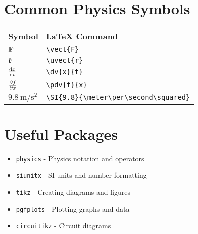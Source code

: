\documentclass[11pt]{book}
\begin{document}
\section{Common Physics Symbols}
\begin{tabular}{ll}
    \toprule
    Symbol & LaTeX Command \\
    \midrule
    $\mathbf{F}$ & \texttt{\textbackslash vect\{F\}} \\
    $\hat{\mathbf{r}}$ & \texttt{\textbackslash uvect\{r\}} \\
    $\dv{x}{t}$ & \texttt{\textbackslash dv\{x\}\{t\}} \\
    $\pdv{f}{x}$ & \texttt{\textbackslash pdv\{f\}\{x\}} \\
    $\SI{9.8}{\meter\per\second\squared}$ & \texttt{\textbackslash SI\{9.8\}\{\textbackslash meter\textbackslash per\textbackslash second\textbackslash squared\}} \\
    \bottomrule
\end{tabular}

\section{Useful Packages}
\begin{itemize}
    \item \texttt{physics} - Physics notation and operators
    \item \texttt{siunitx} - SI units and number formatting
    \item \texttt{tikz} - Creating diagrams and figures
    \item \texttt{pgfplots} - Plotting graphs and data
    \item \texttt{circuitikz} - Circuit diagrams
\end{itemize}
\end{document}
